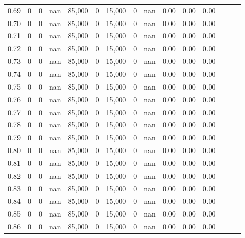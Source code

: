 \begin{tabular}{rrrrrrrrrrrrrrr}
0.69 &      0 &    0 &   nan &  85,000 &       0 &  15,000 &       0 &   nan &  0.00 &  0.00 &      0.00 \\
0.70 &      0 &    0 &   nan &  85,000 &       0 &  15,000 &       0 &   nan &  0.00 &  0.00 &      0.00 \\
0.71 &      0 &    0 &   nan &  85,000 &       0 &  15,000 &       0 &   nan &  0.00 &  0.00 &      0.00 \\
0.72 &      0 &    0 &   nan &  85,000 &       0 &  15,000 &       0 &   nan &  0.00 &  0.00 &      0.00 \\
0.73 &      0 &    0 &   nan &  85,000 &       0 &  15,000 &       0 &   nan &  0.00 &  0.00 &      0.00 \\
0.74 &      0 &    0 &   nan &  85,000 &       0 &  15,000 &       0 &   nan &  0.00 &  0.00 &      0.00 \\
0.75 &      0 &    0 &   nan &  85,000 &       0 &  15,000 &       0 &   nan &  0.00 &  0.00 &      0.00 \\
0.76 &      0 &    0 &   nan &  85,000 &       0 &  15,000 &       0 &   nan &  0.00 &  0.00 &      0.00 \\
0.77 &      0 &    0 &   nan &  85,000 &       0 &  15,000 &       0 &   nan &  0.00 &  0.00 &      0.00 \\
0.78 &      0 &    0 &   nan &  85,000 &       0 &  15,000 &       0 &   nan &  0.00 &  0.00 &      0.00 \\
0.79 &      0 &    0 &   nan &  85,000 &       0 &  15,000 &       0 &   nan &  0.00 &  0.00 &      0.00 \\
0.80 &      0 &    0 &   nan &  85,000 &       0 &  15,000 &       0 &   nan &  0.00 &  0.00 &      0.00 \\
0.81 &      0 &    0 &   nan &  85,000 &       0 &  15,000 &       0 &   nan &  0.00 &  0.00 &      0.00 \\
0.82 &      0 &    0 &   nan &  85,000 &       0 &  15,000 &       0 &   nan &  0.00 &  0.00 &      0.00 \\
0.83 &      0 &    0 &   nan &  85,000 &       0 &  15,000 &       0 &   nan &  0.00 &  0.00 &      0.00 \\
0.84 &      0 &    0 &   nan &  85,000 &       0 &  15,000 &       0 &   nan &  0.00 &  0.00 &      0.00 \\
0.85 &      0 &    0 &   nan &  85,000 &       0 &  15,000 &       0 &   nan &  0.00 &  0.00 &      0.00 \\
0.86 &      0 &    0 &   nan &  85,000 &       0 &  15,000 &       0 &   nan &  0.00 &  0.00 &      0.00 \\

\end{tabular}
